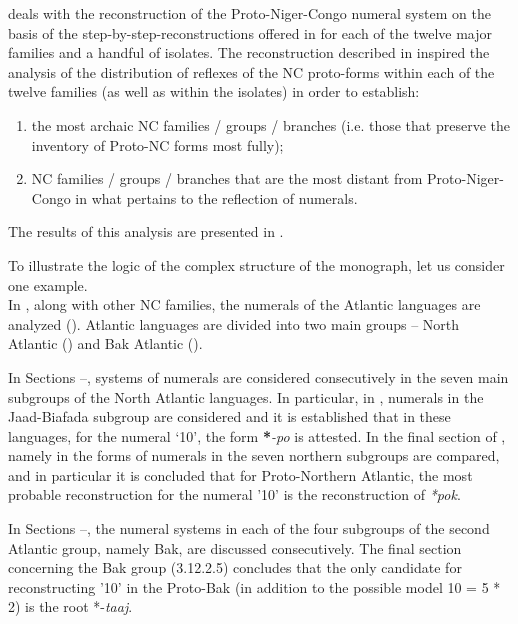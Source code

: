  deals with the reconstruction of the Proto-Niger-Congo numeral system on the basis of the step-by-step-reconstructions offered in  for each of the twelve major families and a handful of isolates.  
The reconstruction described in  inspired the analysis of the distribution of reflexes of the NC proto-forms within each of the twelve families (as well as within the isolates) in order to establish:

\begin{enumerate}
 \item the most archaic NC families / groups / branches (i.e. those that preserve the inventory of Proto-NC forms most fully); 
 \item NC families / groups / branches that are the most distant from Proto-Niger-Congo in what pertains to the reflection of numerals. 
\end{enumerate}

 
The results of this analysis are presented in .

To illustrate the logic of the complex structure of the monograph, let us consider one example.\\

In , along with other NC families, the numerals of the Atlantic languages are analyzed (). Atlantic languages are divided into two main groups – North Atlantic () and Bak Atlantic ().

In Sections –, systems of numerals are considered consecutively in the seven main subgroups of the North Atlantic languages. In particular, in , numerals in the Jaad-Biafada subgroup are considered and it is established that in these languages, for the numeral ‘10', the form \textbf{*}\textit{{}-po} is attested. In the final section of , namely in  the forms of numerals in the seven northern subgroups are compared, and in particular it is concluded that for Proto-Northern Atlantic, the most probable reconstruction for the numeral '10' is the reconstruction of \textit{*pok}.

In Sections --, the numeral systems in each of the four subgroups of the second Atlantic group, namely Bak, are discussed consecutively. The final section concerning the Bak group (3.12.2.5) concludes that the only candidate for reconstructing '10' in the Proto-Bak (in addition to the possible model 10 = 5 * 2) is the root *-\textit{taaj}.

